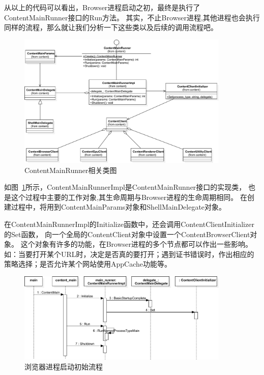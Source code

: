 从以上的代码可以看出，Browser进程启动之初，最终是执行了ContentMainRunner接口的Run方法。
其实，不止Browser进程,其他进程也会执行同样的流程，那么就让我们分析一下这些类以及后续的调用流程吧。

\begin{figure}[H] 
  \centering 
  \includegraphics[width=0.90\textwidth]{image/process_study/ContentMainRunner.pdf} 
  \caption{ContentMainRunner相关类图} \label{fig:ContentMainRunnerClass} 
\end{figure}

如图~\ref{fig:ContentMainRunnerClass}所示，ContentMainRunnerImpl是ContentMainRunner接口的实现类，
也是这个过程中主要的工作对象,其生命周期与Browser进程的生命周期相同。
在创建过程中，将用到ContentMainParams对象和ShellMainDelegate对象。

在ContentMainRunnerImpl的Initialize函数中，还会调用ContentClientInitializer的Set函数，
向一个全局的ContentClient对象中设置一个ContentBrowserClient对象。
这个对象有许多的功能，在Browser进程的多个节点都可以作出一些影响。
如：当要打开某个URL时，决定是否真的要打开；遇到证书错误时，作出相应的策略选择；是否允许某个网站使用AppCache功能等。

\begin{figure}[H] 
  \centering 
  \includegraphics[width=0.90\textwidth]{image/process_study/ContentMainRunnerSequence.pdf} 
  \caption{浏览器进程启动初始流程} \label{fig:ContentMainRunnerSequence} 
\end{figure}

